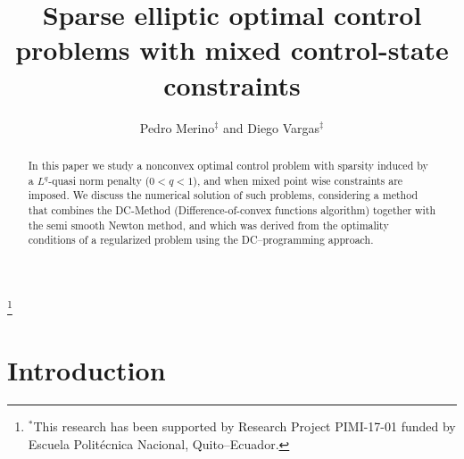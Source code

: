 \documentclass[11pt,a4paper]{amsart}
\begin{document}
	\title[Nonconvex optimal control problems]{ Sparse elliptic optimal control problems with mixed control-state constraints}
	
	\author{Pedro Merino$^\ddag$ and Diego Vargas$^\ddag$}
	\address{$^\ddag$Research Center of Mathematical Modeling (MODEMAT) and Department of Mathematics, Escuela Polit\'ecnica Nacional, Quito, Ecuador}
	\keywords{}
	\thanks{$^*$This research has been supported by Research Project PIMI-17-01 funded by Escuela Polit\'ecnica Nacional, Quito--Ecuador.}
	
	\smallskip
\begin{abstract}
In this paper we study a nonconvex optimal control problem with sparsity induced by a $L^q$-quasi norm penalty ($0<q<1$), and when mixed point wise constraints are imposed. We discuss the numerical solution of such problems, considering a method that combines the DC-Method (Difference-of-convex functions algorithm) together with the semi smooth Newton method, and which was derived from the optimality conditions of a regularized problem using the DC--programming approach.
\end{abstract}
	
\maketitle 

\tableofcontents



\section{Introduction}
\end{document}
